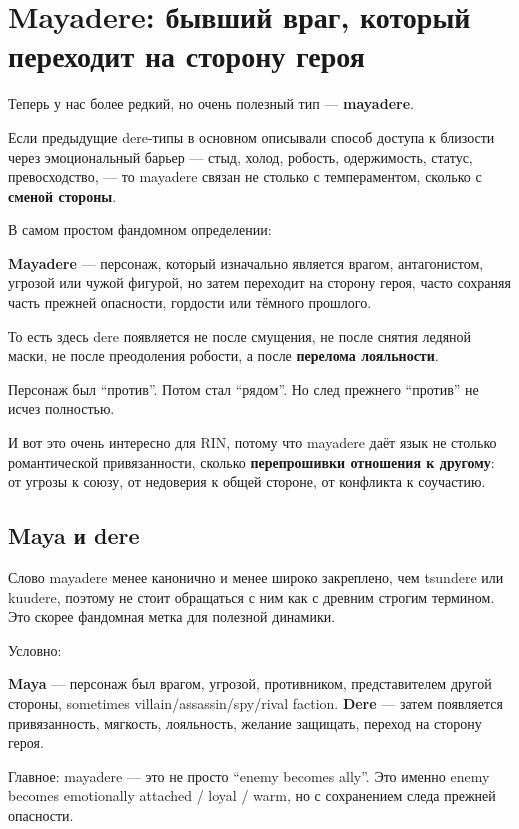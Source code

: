\section{Mayadere: бывший враг, который переходит на сторону героя}

Теперь у нас более редкий, но очень полезный тип --- \textbf{mayadere}.

Если предыдущие dere-типы в основном описывали способ доступа к близости
через эмоциональный барьер --- стыд, холод, робость, одержимость,
статус, превосходство, --- то mayadere связан не столько с
темпераментом, сколько с \textbf{сменой стороны}.

В самом простом фандомном определении:

\textbf{Mayadere} --- персонаж, который изначально является врагом,
антагонистом, угрозой или чужой фигурой, но затем переходит на сторону
героя, часто сохраняя часть прежней опасности, гордости или тёмного
прошлого.

То есть здесь dere появляется не после смущения, не после снятия ледяной
маски, не после преодоления робости, а после \textbf{перелома
лояльности}.

Персонаж был ``против''. Потом стал ``рядом''. Но след прежнего
``против'' не исчез полностью.

И вот это очень интересно для RIN, потому что mayadere даёт язык не
столько романтической привязанности, сколько \textbf{перепрошивки
отношения к другому}: от угрозы к союзу, от недоверия к общей стороне,
от конфликта к соучастию.

\subsection*{Maya и dere}

Слово mayadere менее канонично и менее широко закреплено, чем tsundere
или kuudere, поэтому не стоит обращаться с ним как с древним строгим
термином. Это скорее фандомная метка для полезной динамики.

Условно:

\textbf{Maya} --- персонаж был врагом, угрозой, противником,
представителем другой стороны, sometimes villain/\hspace{0pt}assassin/\hspace{0pt}spy/\hspace{0pt}rival
faction. \textbf{Dere} --- затем появляется привязанность, мягкость,
лояльность, желание защищать, переход на сторону героя.

Главное: mayadere --- это не просто ``enemy becomes ally''. Это именно
enemy becomes emotionally attached /\hspace{0pt} loyal /\hspace{0pt} warm, но с сохранением
следа прежней опасности.

